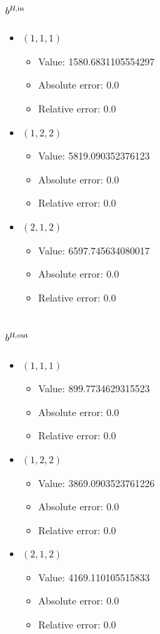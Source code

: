 \documentclass{article}%
\begin{document}
\subsection{$b^{\textsl{H},\text{in}}$}%
\begin{itemize}%
	\item $(1, 1, 1)$%
	\begin{itemize}%
		\item Value: 1580.6831105554297%
		\item Absolute error: 0.0%
		\item Relative error: 0.0%
	\end{itemize}%
	\item $(1, 2, 2)$%
	\begin{itemize}%
		\item Value: 5819.090352376123%
		\item Absolute error: 0.0%
		\item Relative error: 0.0%
	\end{itemize}%
	\item $(2, 1, 2)$%
	\begin{itemize}%
		\item Value: 6597.745634080017%
		\item Absolute error: 0.0%
		\item Relative error: 0.0%
	\end{itemize}%
\end{itemize}%
\subsection{$b^{\textsl{H},\text{out}}$}%
\begin{itemize}%
	\item $(1, 1, 1)$%
	\begin{itemize}%
		\item Value: 899.7734629315523%
		\item Absolute error: 0.0%
		\item Relative error: 0.0%
	\end{itemize}%
	\item $(1, 2, 2)$%
	\begin{itemize}%
		\item Value: 3869.0903523761226%
		\item Absolute error: 0.0%
		\item Relative error: 0.0%
	\end{itemize}%
	\item $(2, 1, 2)$%
	\begin{itemize}%
		\item Value: 4169.110105515833%
		\item Absolute error: 0.0%
		\item Relative error: 0.0%
	\end{itemize}%
\end{itemize}%
\end{document}
